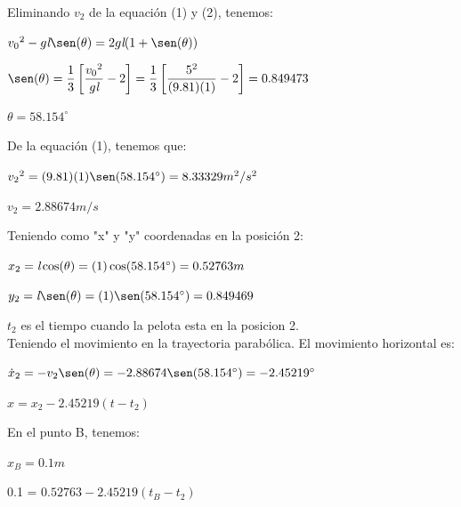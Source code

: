 \documentclass[a4paper,11pt]{scrartcl}
\begin{document}
\begin{center}
Eliminando $v_{2}$ de la equación (1) y (2), tenemos:\\
\begin{center}
${v_{0}}^{2} - g\emph{l}\sen(\theta) = 2g\emph{l}(1 + \sen(\theta))$\\
\end{center}
\begin{center}
$\sen(\theta) = \dfrac{1}{3}\left[\dfrac{{v_{0}}^{2}}{g\emph{l}} - 2\right] =  \dfrac{1}{3}\left[\dfrac{5^{2}}{(9.81)(1)} - 2\right] = 0.849473 $\\
\end{center}
\begin{center}
$\theta = 58.154^{\circ} $
\end{center}

De la equación (1), tenemos que:\\
\begin{center}
${v_{2}}^{2} = (9.81)(1)\sen(58.154^{\circ}) = 8.33329 m^{2}/s^{2} $\\
\end{center}
\begin{center}
$v_{2} = 2.88674 m/s$\\
\end{center}

Teniendo como "x" y "y" coordenadas en la posición 2:\\
\begin{center}
$x_{2} = \emph{l}\cos(\theta) = (1)\cos(58.154^{\circ}) = 0.52763 m $\\
\end{center}
\begin{center}
$y_{2} = \emph{l}\sen(\theta) = (1)\sen(58.154^{\circ}) = 0.849469 $\\
\end{center}

$t_{2}$ es el tiempo cuando la pelota esta en la posicion 2.\\
Teniendo el movimiento en la trayectoria parabólica. El movimiento horizontal es:\\
\begin{center}
$\dot{x}_{2} = -v_{2}\sen(\theta) = -2.88674\sen(58.154^{\circ}) = -2.45219^{\circ} $\\
\end{center}
\begin{center}
$x = x_{2} - 2.45219(t - t_{2})$\\
\end{center}

En el punto B, tenemos:\\
\begin{center}
$x_{B} = 0.1 m $\\
\end{center}
\begin{center}
0.1 = $ 0.52763 - 2.45219(t_{B} - t_{2})$\\
\end{center}


\end{center}
\end{document}
